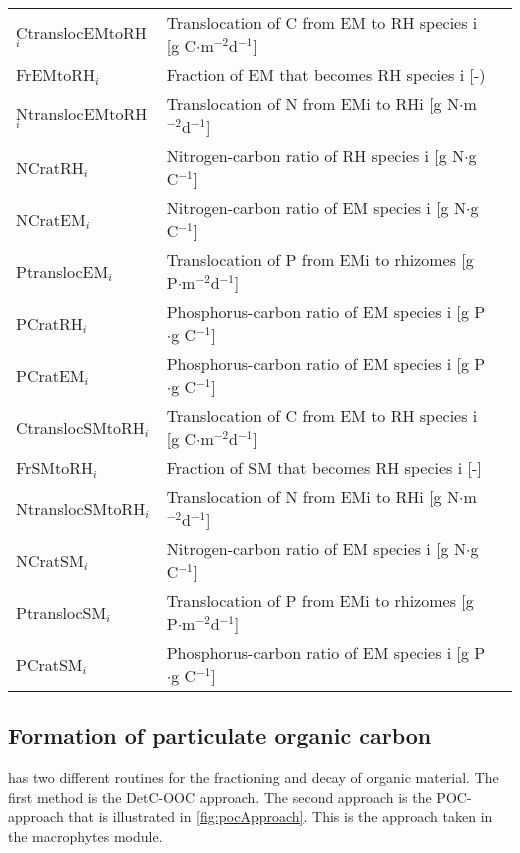 \begin{tabular}{lll}
CtranslocEMtoRH$_i$      & Translocation of C from EM to RH species i      [g C$\cdot$m$^{-2}$d$^{-1}$]   \\
FrEMtoRH$_i$             & Fraction of EM that becomes RH species i        [-)                            \\
NtranslocEMtoRH$_i$      & Translocation of N from EMi to RHi              [g N$\cdot$m$^{-2}$d$^{-1}$]   \\
NCratRH$_i$              & Nitrogen-carbon ratio of RH species i           [g N$\cdot$g C$^{-1}$]         \\
NCratEM$_i$              & Nitrogen-carbon ratio of EM species i           [g N$\cdot$g C$^{-1}$]         \\
PtranslocEM$_i$          & Translocation of P from EMi to rhizomes         [g P$\cdot$m$^{-2}$d$^{-1}$]   \\
PCratRH$_i$              & Phosphorus-carbon ratio of EM species i         [g P$\cdot$g C$^{-1}$]         \\
PCratEM$_i$              & Phosphorus-carbon ratio of EM species i         [g P$\cdot$g C$^{-1}$]         \\
CtranslocSMtoRH$_i$      & Translocation of C from EM to RH species i      [g C$\cdot$m$^{-2}$d$^{-1}$]   \\
FrSMtoRH$_i$             & Fraction of SM that becomes RH species i        [-]                            \\
NtranslocSMtoRH$_i$      & Translocation of N from EMi to RHi              [g N$\cdot$m$^{-2}$d$^{-1}$]   \\
NCratSM$_i$              & Nitrogen-carbon ratio of EM species i           [g N$\cdot$g C$^{-1}$]         \\
PtranslocSM$_i$          & Translocation of P from EMi to rhizomes         [g P$\cdot$m$^{-2}$d$^{-1}$]   \\
PCratSM$_i$              & Phosphorus-carbon ratio of EM species i         [g P$\cdot$g C$^{-1}$]         \\
\end{tabular}

\subsection{Formation of particulate organic carbon}
\DWAQ has two different routines for the fractioning and decay of organic material.
The first method is the DetC-OOC approach.
The second approach is the POC-approach that is illustrated in \autoref{fig:pocApproach}.
This is the approach taken in the macrophytes module.

